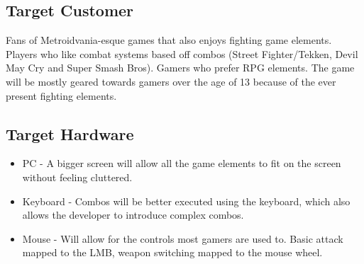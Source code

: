 \documentclass{article}
\begin{document}
\subsection*{Target Customer}
Fans of Metroidvania-esque games that also enjoys fighting game elements. Players who like combat systems based off combos (Street Fighter/Tekken, Devil May Cry and Super Smash Bros).
Gamers who prefer RPG elements. The game will be mostly geared towards gamers over the age of 13 because of the ever present fighting elements. 


\subsection*{Target Hardware}
    \begin{itemize}
        \item PC - A bigger screen will allow all the game elements to fit on the screen without feeling cluttered. 
        \item Keyboard - Combos will be better executed using the keyboard, which also allows the developer to introduce complex combos.
        \item Mouse - Will allow for the controls most gamers are used to. Basic attack mapped to the LMB, weapon switching mapped to the mouse wheel.
    \end{itemize}
    
\end{document}
